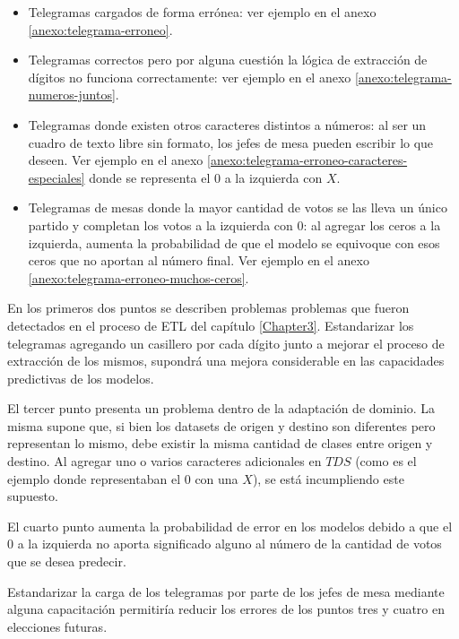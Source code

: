 \begin{itemize}
    \item Telegramas cargados de forma errónea: ver ejemplo en el anexo \ref{anexo:telegrama-erroneo}.
    \item Telegramas correctos pero por alguna cuestión la lógica de extracción de dígitos no funciona correctamente: ver ejemplo
          en el anexo \ref{anexo:telegrama-numeros-juntos}.
    \item Telegramas donde existen otros caracteres distintos a números: al ser un cuadro de texto libre sin formato, los jefes
          de mesa pueden escribir lo que deseen. Ver ejemplo en el anexo \ref{anexo:telegrama-erroneo-caracteres-especiales}
          donde se representa el $0$ a la izquierda con $X$.
    \item Telegramas de mesas donde la mayor cantidad de votos se las lleva un único partido y completan los votos a la izquierda
          con $0$: al agregar los ceros a la izquierda, aumenta la probabilidad de que el modelo se equivoque con esos ceros que
          no aportan al número final. Ver ejemplo en el anexo \ref{anexo:telegrama-erroneo-muchos-ceros}.
\end{itemize}

En los primeros dos puntos se describen problemas problemas que fueron detectados en el proceso de ETL del capítulo
\ref{Chapter3}. Estandarizar los telegramas agregando un casillero por cada dígito junto a mejorar el proceso de
extracción de los mismos, supondrá una mejora considerable en las capacidades predictivas de los modelos.

El tercer punto presenta un problema dentro de la adaptación de dominio. La misma supone que, si bien los datasets de
origen y destino son diferentes pero representan lo mismo, debe existir la misma cantidad de clases entre origen y
destino. Al agregar uno o varios caracteres adicionales en $TDS$ (como es el ejemplo donde representaban el $0$ con una
$X$), se está incumpliendo este supuesto.

El cuarto punto aumenta la probabilidad de error en los modelos debido a que el $0$ a la izquierda no aporta
significado alguno al número de la cantidad de votos que se desea predecir.

Estandarizar la carga de los telegramas por parte de los jefes de mesa mediante alguna capacitación permitiría reducir
los errores de los puntos tres y cuatro en elecciones futuras.

